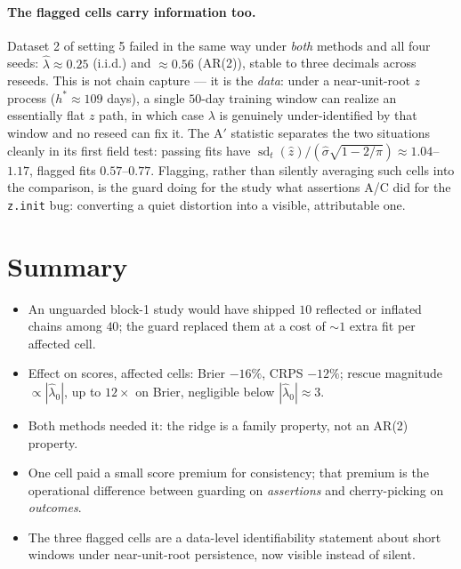 \documentclass[11pt]{article}
\newcommand{\code}[1]{\texttt{#1}}
\DeclareMathOperator{\sd}{sd}
\begin{document}
\paragraph{The flagged cells carry information too.} Dataset 2 of setting 5
failed in the same way under \emph{both} methods and all four seeds:
$\hat\lambda \approx 0.25$ (i.i.d.) and $\approx 0.56$ (AR(2)), stable to
three decimals across reseeds. This is not chain capture --- it is the
\emph{data}: under a near-unit-root $z$ process ($h^\ast \approx 109$ days),
a single $50$-day training window can realize an essentially flat $z$ path,
in which case $\lambda$ is genuinely under-identified by that window and no
reseed can fix it. The A$'$ statistic separates the two situations cleanly
in its first field test: passing fits have
$\sd_t(\hat z)/(\hat\sigma\sqrt{1 - 2/\pi}) \approx 1.04$--$1.17$, flagged
fits $0.57$--$0.77$. Flagging, rather than silently averaging such cells
into the comparison, is the guard doing for the study what assertions A/C
did for the \code{z.init} bug: converting a quiet distortion into a visible,
attributable one.

\section{Summary}

\begin{itemize}\itemsep2pt
  \item An unguarded block-1 study would have shipped $10$ reflected or
        inflated chains among $40$; the guard replaced them at a cost of
        $\sim\!1$ extra fit per affected cell.
  \item Effect on scores, affected cells: Brier $-16\%$, CRPS $-12\%$;
        rescue magnitude $\propto |\hat\lambda_0|$, up to $12\times$ on
        Brier, negligible below $|\hat\lambda_0| \approx 3$.
  \item Both methods needed it: the ridge is a family property, not an
        AR(2) property.
  \item One cell paid a small score premium for consistency; that premium is
        the operational difference between guarding on \emph{assertions} and
        cherry-picking on \emph{outcomes}.
  \item The three flagged cells are a data-level identifiability statement
        about short windows under near-unit-root persistence, now visible
        instead of silent.
\end{itemize}
\end{document}
